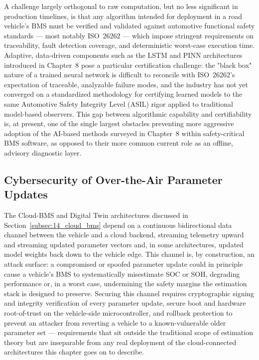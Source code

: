 A challenge largely orthogonal to raw computation, but no less significant in production timelines, is that any algorithm intended for deployment in a road vehicle's BMS must be verified and validated against automotive functional safety standards — most notably ISO~26262 — which impose stringent requirements on traceability, fault detection coverage, and deterministic worst-case execution time. Adaptive, data-driven components such as the LSTM and PINN architectures introduced in Chapter~8 pose a particular certification challenge: the "black box" nature of a trained neural network is difficult to reconcile with ISO~26262's expectation of traceable, analyzable failure modes, and the industry has not yet converged on a standardized methodology for certifying learned models to the same Automotive Safety Integrity Level (ASIL) rigor applied to traditional model-based observers. This gap between algorithmic capability and certifiability is, at present, one of the single largest obstacles preventing more aggressive adoption of the AI-based methods surveyed in Chapter~8 within safety-critical BMS software, as opposed to their more common current role as an offline, advisory diagnostic layer.

\subsection{Cybersecurity of Over-the-Air Parameter Updates}
\label{subsec:14_cybersecurity}

The Cloud-BMS and Digital Twin architectures discussed in Section~\ref{subsec:14_cloud_bms} depend on a continuous bidirectional data channel between the vehicle and a cloud backend, streaming telemetry upward and streaming updated parameter vectors and, in some architectures, updated model weights back down to the vehicle edge. This channel is, by construction, an attack surface: a compromised or spoofed parameter update could in principle cause a vehicle's BMS to systematically misestimate SOC or SOH, degrading performance or, in a worst case, undermining the safety margins the estimation stack is designed to preserve. Securing this channel requires cryptographic signing and integrity verification of every parameter update, secure boot and hardware root-of-trust on the vehicle-side microcontroller, and rollback protection to prevent an attacker from reverting a vehicle to a known-vulnerable older parameter set — requirements that sit outside the traditional scope of estimation theory but are inseparable from any real deployment of the cloud-connected architectures this chapter goes on to describe.

